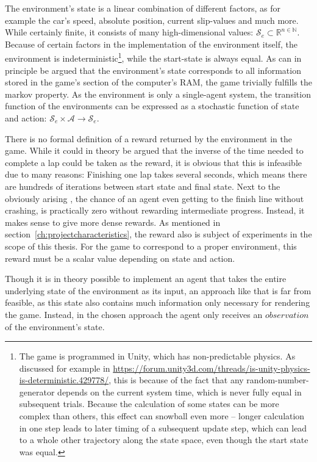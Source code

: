 The environment's state is a linear combination of different factors, as for example the car's speed, absolute position, current slip-values and much more. While certainly finite, it consists of many high-dimensional values: $\mathcal{S}_e \subset \mathds{R}^{n \in \mathds{N}}$. Because of certain factors in the implementation of the environment itself, the environment is indeterministic\footnote{The game is programmed in Unity, which has non-predictable physics. As discussed for example in \url{https://forum.unity3d.com/threads/is-unity-physics-is-deterministic.429778/}, this is because of the fact that any random-number-generator depends on the current system time, which is never fully equal in subsequent trials. Because the calculation of some states can be more complex than others, this effect can snowball even more -- longer calculation in one step leads to later timing of a subsequent update step, which can lead to a whole other trajectory along the state space, even though the start state was equal.}, while the start-state is always equal. As can in principle be argued that the environment's state corresponds to all information stored in the game's section of the computer's RAM, the game trivially fulfills the markov property. As the environment is only a single-agent system, the transition function of the environments can be expressed as a stochastic function of state and action: $\mathcal{S}_e \times \mathcal{A} \rightarrow \mathcal{S}_e$.

There is no formal definition of a reward returned by the environment in the game. While it could in theory be argued that the inverse of the time needed to complete a lap could be taken as the reward, it is obvious that this is infeasible due to many reasons: Finishing one lap takes several seconds, which means there are hundreds of iterations between start state and final state. Next to the obviously arising , the chance of an agent even getting to the finish line without crashing, is practically zero without rewarding intermediate progress. Instead, it makes sense to give more dense rewards. As mentioned in section~\ref{ch:projectcharacteristics}, the reward also is subject of experiments in the scope of this thesis. For the game to correspond to a proper environment, this reward must be a scalar value depending on state and action.

Though it is in theory possible to implement an agent that takes the entire underlying state of the environment as its input, an approach like that is far from feasible, as this state also contains much information only necessary for rendering the game. Instead, in the chosen approach the agent only receives an $observation$ of the environment's state. 

